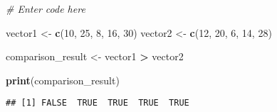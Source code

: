 \documentclass[
]{article}
\newenvironment{Shaded}{\begin{snugshade}}{\end{snugshade}}
\newcommand{\CommentTok}[1]{\textcolor[rgb]{0.56,0.35,0.01}{\textit{#1}}}
\newcommand{\DecValTok}[1]{\textcolor[rgb]{0.00,0.00,0.81}{#1}}
\newcommand{\FunctionTok}[1]{\textcolor[rgb]{0.13,0.29,0.53}{\textbf{#1}}}
\newcommand{\NormalTok}[1]{#1}
\newcommand{\OtherTok}[1]{\textcolor[rgb]{0.56,0.35,0.01}{#1}}
\newcommand{\SpecialCharTok}[1]{\textcolor[rgb]{0.81,0.36,0.00}{\textbf{#1}}}
\begin{document}
\begin{Shaded}
\begin{Highlighting}[]
\CommentTok{\# Enter code here}

\NormalTok{vector1 }\OtherTok{\textless{}{-}} \FunctionTok{c}\NormalTok{(}\DecValTok{10}\NormalTok{, }\DecValTok{25}\NormalTok{, }\DecValTok{8}\NormalTok{, }\DecValTok{16}\NormalTok{, }\DecValTok{30}\NormalTok{)}
\NormalTok{vector2 }\OtherTok{\textless{}{-}} \FunctionTok{c}\NormalTok{(}\DecValTok{12}\NormalTok{, }\DecValTok{20}\NormalTok{, }\DecValTok{6}\NormalTok{, }\DecValTok{14}\NormalTok{, }\DecValTok{28}\NormalTok{)}

\NormalTok{comparison\_result }\OtherTok{\textless{}{-}}\NormalTok{ vector1 }\SpecialCharTok{\textgreater{}}\NormalTok{ vector2}

\FunctionTok{print}\NormalTok{(comparison\_result)}
\end{Highlighting}
\end{Shaded}

\begin{verbatim}
## [1] FALSE  TRUE  TRUE  TRUE  TRUE
\end{verbatim}
\end{document}
